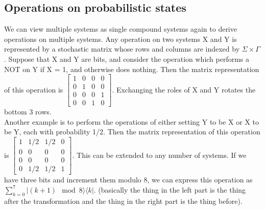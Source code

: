 \documentclass{amsart}
\begin{document}
\subsection*{Operations on probabilistic states}
We can view multiple systems as single compound systems again to derive operations on multiple
systems. Any operation on two systems X and Y is represented by a stochastic matrix whose rows
and columns are indexed by $ \Sigma \times \Gamma $. Suppose that X and Y are bits, and
consider the operation which performs a NOT on Y if X = 1, and otherwise does nothing. Then
the matrix representation of this operation is $ \begin{bmatrix}
1 & 0 & 0 & 0 \\ 0 & 1 & 0 & 0 \\ 0 & 0 & 0 & 1 \\ 0 & 0 & 1 & 0
\end{bmatrix} $. Exchanging the roles of X and Y rotates the bottom 3 rows. \\
Another example is to perform the operations of either setting Y to be X or X to be Y, each
with probability 1/2. Then the matrix representation of this operation is $ \begin{bmatrix}
1 & 1/2 & 1/2 & 0 \\ 0 & 0 & 0 & 0 \\ 0 & 0 & 0 & 0 \\ 0 & 1/2 & 1/2 & 1
\end{bmatrix} $. This can be extended to any number of systems. If we have three bits and
increment them modulo 8, we can express this operation as $ \sum_{k=0}^7 |(k+1) \mod 8 \rangle
\langle k| $. (basically the thing in the left part is the thing after the transformation and
the thing in the right part is the thing before). \\
\end{document}
